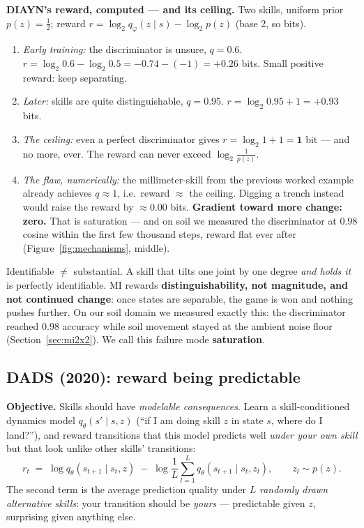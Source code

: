 \documentclass[11pt,a4paper]{article}
\begin{document}
\begin{worked}
\textbf{DIAYN's reward, computed --- and its ceiling.} Two skills, uniform
prior $p(z) = \tfrac12$; reward $r = \log_2 q_\varphi(z \mid s) - \log_2 p(z)$
(base 2, so bits).
\begin{enumerate}[leftmargin=6mm, itemsep=0mm]
\item \emph{Early training:} the discriminator is unsure, $q = 0.6$.
$r = \log_2 0.6 - \log_2 0.5 = -0.74 - (-1) = \mathbf{+0.26}$ bits. Small
positive reward: keep separating.
\item \emph{Later:} skills are quite distinguishable, $q = 0.95$.
$r = \log_2 0.95 + 1 = \mathbf{+0.93}$ bits.
\item \emph{The ceiling:} even a perfect discriminator gives
$r = \log_2 1 + 1 = \mathbf{1}$ bit --- and no more, ever. The reward can
never exceed $\log_2 \tfrac{1}{p(z)}$.
\item \emph{The flaw, numerically:} the millimeter-skill from the previous
worked example already achieves $q \approx 1$, i.e.\ reward
$\approx$ the ceiling. Digging a trench instead would raise the reward by
$\approx \mathbf{0.00}$ bits. \textbf{Gradient toward more change: zero.}
That is saturation --- and on soil we measured the discriminator at $0.98$
cosine within the first few thousand steps, reward flat ever after
(Figure~\ref{fig:mechanisms}, middle).
\end{enumerate}
\end{worked}

\begin{pitfall}
Identifiable $\neq$ substantial. A skill that tilts one joint by one degree
\emph{and holds it} is perfectly identifiable. MI rewards
\textbf{distinguishability, not magnitude, and not continued change}: once states
are separable, the game is won and nothing pushes further. On our soil domain we
measured exactly this: the discriminator reached $0.98$ accuracy while soil
movement stayed at the ambient noise floor (Section~\ref{sec:mi2x2}). We call
this failure mode \textbf{saturation}.
\end{pitfall}

\subsection{DADS (2020): reward being predictable}

\textbf{Objective.} Skills should have \emph{modelable consequences}. Learn a
skill-conditioned dynamics model $q_\theta(s' \mid s, z)$ (``if I am doing skill
$z$ in state $s$, where do I land?''), and reward transitions that this model
predicts well \emph{under your own skill} but that look unlike other skills'
transitions:
\[
r_t \;=\; \log q_\theta(s_{t+1} \mid s_t, z)
\;-\; \log \frac{1}{L}\sum_{l=1}^{L} q_\theta(s_{t+1} \mid s_t, z_l),
\qquad z_l \sim p(z).
\]
The second term is the average prediction quality under $L$ \emph{randomly
drawn alternative skills}: your transition should be \emph{yours} --- predictable
given $z$, surprising given anything else.
\end{document}
